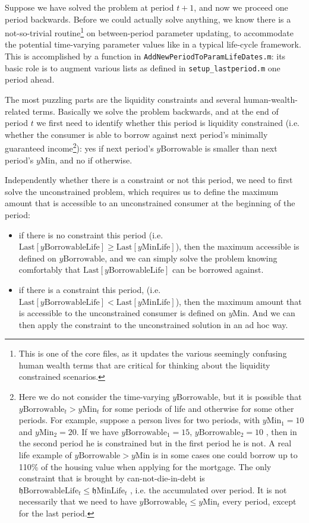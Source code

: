 \documentclass[titlepage,abstract]{\econtex}
\providecommand{\hEndMinLife}{\mathfrak{h}\text{MinLife}}
\providecommand{\hEndBorrowableLife}{\mathfrak{h}\text{BorrowableLife}}
\providecommand{\yMinLife}{y\text{MinLife}}
\providecommand{\yBorrowableLife}{y\text{BorrowableLife}}
\providecommand{\yMin}{y\text{Min}}
\providecommand{\yBorrowable}{y\text{Borrowable}}
\begin{document}
Suppose we have solved the problem at period $t+1$, and now we proceed one period backwards. Before we could actually solve anything, we know there is a not-so-trivial routine\footnote{This is one of the core files, as it updates the various seemingly confusing human wealth terms that are critical for thinking about the liquidity constrained scenarios.} on between-period parameter updating, to accommodate the potential time-varying parameter values like in a typical life-cycle framework. This is accomplished by a function in \texttt{AddNewPeriodToParamLifeDates.m}: its basic role is to augment various lists as defined in \texttt{setup\_lastperiod.m} one period ahead.

The most puzzling parts are the liquidity constraints and several human-wealth-related terms. Basically we solve the problem backwards, and at the end of period $t$ we first need to identify whether this period is liquidity constrained (i.e. whether the consumer is able to borrow against next period's minimally guaranteed income\footnote{Here we do not consider the time-varying $\yBorrowable$, but it is possible that $\yBorrowable_{t} > \yMin_{t}$ for some periods of life and otherwise for some other periods. For example, suppose a person lives for two periods, with $\yMin_{1}=10$ and $\yMin_{2}=20$. If we have $\yBorrowable_{1}=15$, $\yBorrowable_{2}=10$
, then in the second period he is constrained but in the first period he is not. A real life example of $\yBorrowable>\yMin$ is in some cases one could borrow up to 110\% of the housing value when applying for the mortgage.
The only constraint that is brought by can-not-die-in-debt is $\hEndBorrowableLife_{t} \leq \hEndMinLife_{t}$
, i.e. the accumulated over period. It is not necessarily that we need to have $\yBorrowable_{t} \leq \yMin_{t}$ every period, except for the last period.}): yes if next period's $\yBorrowable$ is smaller than next period's $\yMin$, and no if otherwise.

Independently whether there is a constraint or not this period, we need to first solve the unconstrained problem, which requires us to define the maximum amount that is accessible to an unconstrained consumer at the beginning of the period:
\begin{itemize}
\item if there is no constraint this period (i.e. $\text{Last}[\yBorrowableLife] \geq \text{Last}[\yMinLife]$), then the maximum accessible is defined on $\yBorrowable$, and we can simply solve the problem knowing comfortably that $\text{Last}[\yBorrowableLife]$ can be borrowed against.
\item if there is a constraint this period, (i.e. $\text{Last}[\yBorrowableLife]<\text{Last}[\yMinLife]$), then the maximum amount that is accessible to the unconstrained consumer is defined on $\yMin$. And we can then apply the constraint to the unconstrained solution in an ad hoc way.
\end{itemize}
\end{document}
